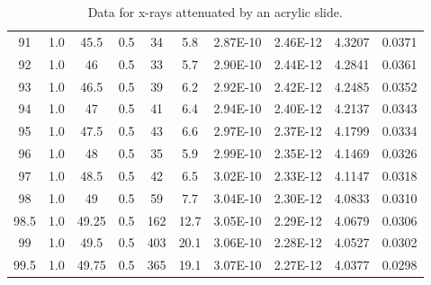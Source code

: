 \documentclass[justified]{tufte-book}
\begin{document}
\begin{table}[ht]
\begin{tabular}{cccccccccc}
91        & 1.0 & 45.5     & 0.5         & 34    & 5.8      & 2.87E-10      & 2.46E-12         & 4.3207       & 0.0371 \\
92        & 1.0 & 46       & 0.5         & 33    & 5.7      & 2.90E-10      & 2.44E-12         & 4.2841       & 0.0361 \\
93        & 1.0 & 46.5     & 0.5         & 39    & 6.2      & 2.92E-10      & 2.42E-12         & 4.2485       & 0.0352 \\
94        & 1.0 & 47       & 0.5         & 41    & 6.4      & 2.94E-10      & 2.40E-12         & 4.2137       & 0.0343 \\
95        & 1.0 & 47.5     & 0.5         & 43    & 6.6      & 2.97E-10      & 2.37E-12         & 4.1799       & 0.0334 \\
96        & 1.0 & 48       & 0.5         & 35    & 5.9      & 2.99E-10      & 2.35E-12         & 4.1469       & 0.0326 \\
97        & 1.0 & 48.5     & 0.5         & 42    & 6.5      & 3.02E-10      & 2.33E-12         & 4.1147       & 0.0318 \\
98        & 1.0 & 49       & 0.5         & 59    & 7.7      & 3.04E-10      & 2.30E-12         & 4.0833       & 0.0310 \\
98.5        & 1.0 & 49.25    & 0.5         & 162   & 12.7     & 3.05E-10      & 2.29E-12         & 4.0679       & 0.0306 \\
99        & 1.0 & 49.5     & 0.5         & 403   & 20.1     & 3.06E-10      & 2.28E-12         & 4.0527       & 0.0302 \\
99.5       & 1.0 & 49.75    & 0.5         & 365   & 19.1     & 3.07E-10      & 2.27E-12         & 4.0377       & 0.0298 \\
\end{tabular}
\caption{Data for x-rays attenuated by an acrylic slide.}
\label{tab:xrcg5}
\end{table}
\end{document}
